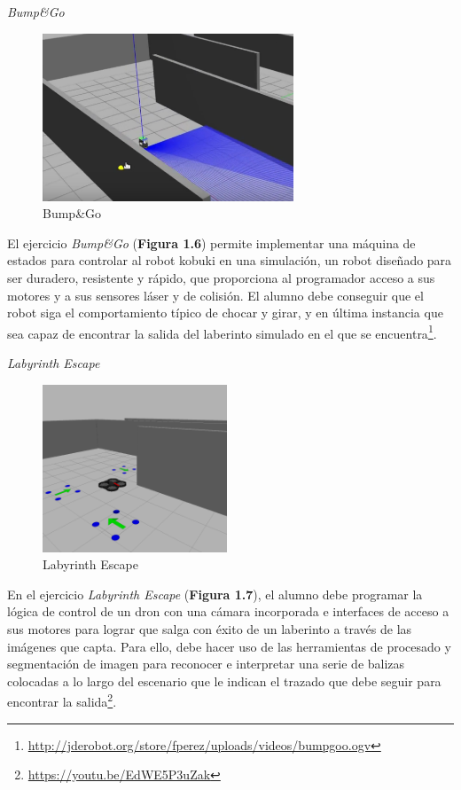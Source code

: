 \begin{multicols}{2}

\hspace{0.25\linewidth}
\textit{Bump\&Go}

\begin{figure}[H]
  \begin{center}
    \includegraphics[width=0.98\linewidth, height=5cm]{figures/bumpngo.png}
		\caption{Bump{\&}Go}
		\label{fig.bumpgo}
		\end{center}
\end{figure}

El ejercicio \textit{Bump\&Go} (\textbf{Figura 1.6}) permite implementar una máquina de estados para controlar al robot kobuki en una simulación, un robot diseñado para ser duradero, resistente y rápido, que proporciona al programador acceso a sus motores y a sus sensores láser y de colisión. El alumno debe conseguir que el robot siga el comportamiento típico de chocar y girar, y en última instancia que sea capaz de encontrar la salida del laberinto simulado en el que se encuentra\footnote{\url{http://jderobot.org/store/fperez/uploads/videos/bumpgoo.ogv}}.

\hspace{0.25\linewidth}
\textit{Labyrinth Escape}

\begin{figure}[H]
  \begin{center}
    \includegraphics[width=0.98\linewidth, height=5cm]{figures/labyrinth_escape.png}
		\caption{Labyrinth Escape}
		\label{fig.laby}
		\end{center}
\end{figure}

En el ejercicio \textit{Labyrinth Escape} (\textbf{Figura 1.7}), el alumno debe programar la lógica de control de un dron con una cámara incorporada e interfaces de acceso a sus motores para lograr que salga con éxito de un laberinto a través de las imágenes que capta. Para ello, debe hacer uso de las herramientas de procesado y segmentación de imagen para reconocer e interpretar una serie de balizas colocadas a lo largo del escenario que le indican el trazado que debe seguir para encontrar la salida\footnote{\url{https://youtu.be/EdWE5P3uZak}}.

\end{multicols}
